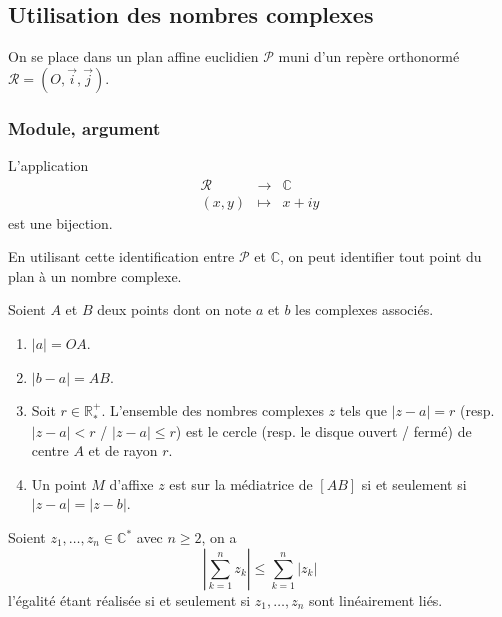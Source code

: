 




  \subsection{Utilisation des nombres complexes}

  On se place dans un plan affine euclidien $\mathcal{P}$ muni d'un repère orthonormé $\mathcal{R} = (O, \overrightarrow{i}, \overrightarrow{j})$.

  \subsubsection{Module, argument}


  \begin{theorem}
    L'application
    \[
      \begin{array}{ccc}
        \mathcal{R} &\rightarrow& \mathbb{C} \\
        (x,y) &\mapsto& x+iy
      \end{array}
    \]
    est une bijection.
  \end{theorem}

  En utilisant cette identification entre $\mathcal{P}$ et $\mathbb{C}$, on peut identifier tout point du plan à un nombre complexe.

  \begin{theorem}
    Soient $A$ et $B$ deux points dont on note $a$ et $b$ les complexes associés.
    \begin{enumerate}[label={\bfseries(\roman*)}]
      \item $\vert a \vert = OA$.
      \item $\vert b - a \vert = AB$.
      \item Soit $r \in \mathbb{R}_*^+$. L'ensemble des nombres complexes $z$ tels que $\vert z - a \vert = r$ (resp. $\vert z - a \vert < r$ / $\vert z - a \vert \leq r$) est le cercle (resp. le disque ouvert / fermé) de centre $A$ et de rayon $r$.
      \item Un point $M$ d'affixe $z$ est sur la médiatrice de $[AB]$ si et seulement si $\vert z - a \vert = \vert z - b \vert$.
    \end{enumerate}
  \end{theorem}

  \begin{proposition}
    Soient $z_1, \dots, z_n \in \mathbb{C}^*$ avec $n \geq 2$, on a
    \[ \left| \sum_{k=1}^n z_k \right| \leq \sum_{k=1}^n \vert z_k \vert \]
    l'égalité étant réalisée si et seulement si $z_1, \dots, z_n$ sont linéairement liés.
  \end{proposition}

